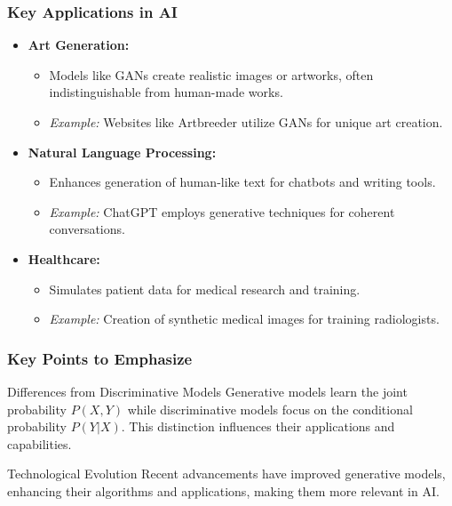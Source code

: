 \documentclass[aspectratio=169]{beamer}
\begin{document}
\begin{frame}[fragile]
    \frametitle{Key Applications in AI}
    \begin{itemize}
        \item \textbf{Art Generation:} 
            \begin{itemize}
                \item Models like GANs create realistic images or artworks, often indistinguishable from human-made works.
                \item \textit{Example:} Websites like Artbreeder utilize GANs for unique art creation.
            \end{itemize}
        \item \textbf{Natural Language Processing:} 
            \begin{itemize}
                \item Enhances generation of human-like text for chatbots and writing tools.
                \item \textit{Example:} ChatGPT employs generative techniques for coherent conversations.
            \end{itemize}
        \item \textbf{Healthcare:} 
            \begin{itemize}
                \item Simulates patient data for medical research and training.
                \item \textit{Example:} Creation of synthetic medical images for training radiologists.
            \end{itemize}
    \end{itemize}
\end{frame}

\begin{frame}[fragile]
    \frametitle{Key Points to Emphasize}
    \begin{block}{Differences from Discriminative Models}
        Generative models learn the joint probability \( P(X, Y) \) while discriminative models focus on the conditional probability \( P(Y | X) \). This distinction influences their applications and capabilities.
    \end{block}
    
    \begin{block}{Technological Evolution}
        Recent advancements have improved generative models, enhancing their algorithms and applications, making them more relevant in AI.
    \end{block}
\end{frame}
\end{document}
